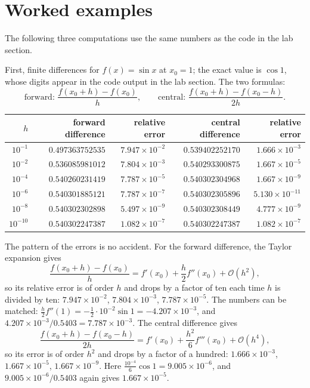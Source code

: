 \section{Worked examples}

The following three computations use the same numbers as the code in the lab section.

First, finite differences for $f(x)=\sin x$ at $x_{0}=1$; the exact value is $\cos 1$, whose
digits appear in the code output in the lab section. The two formulas:
\[
  \text{forward: }\frac{f(x_{0}+h)-f(x_{0})}{h},\qquad
  \text{central: }\frac{f(x_{0}+h)-f(x_{0}-h)}{2h}.
\]

\begin{center}
\begin{tabular}{rrrrr}
\hline
$h$ & forward difference & relative error & central difference & relative error\\
\hline
$10^{-1}$ & $0.497363752535$ & $7.947\times10^{-2}$ & $0.539402252170$ & $1.666\times10^{-3}$\\
$10^{-2}$ & $0.536085981012$ & $7.804\times10^{-3}$ & $0.540293300875$ & $1.667\times10^{-5}$\\
$10^{-4}$ & $0.540260231419$ & $7.787\times10^{-5}$ & $0.540302304968$ & $1.667\times10^{-9}$\\
$10^{-6}$ & $0.540301885121$ & $7.787\times10^{-7}$ & $0.540302305896$ & $5.130\times10^{-11}$\\
$10^{-8}$ & $0.540302302898$ & $5.497\times10^{-9}$ & $0.540302308449$ & $4.777\times10^{-9}$\\
$10^{-10}$ & $0.540302247387$ & $1.082\times10^{-7}$ & $0.540302247387$ & $1.082\times10^{-7}$\\
\hline
\end{tabular}
\end{center}

The pattern of the errors is no accident. For the forward difference, the Taylor expansion
gives
\[
  \frac{f(x_{0}+h)-f(x_{0})}{h}=f'(x_{0})+\frac{h}{2}f''(x_{0})+\mathcal{O}(h^{2}),
\]
so its relative error is of order $h$ and drops by a factor of ten each time $h$ is divided by
ten: $7.947\times10^{-2}$, $7.804\times10^{-3}$, $7.787\times10^{-5}$. The numbers can be
matched: $\frac{h}{2}f''(1)=-\frac{1}{2}\cdot10^{-2}\sin 1=-4.207\times10^{-3}$, and
$4.207\times10^{-3}/0.5403=7.787\times10^{-3}$. The central difference gives
\[
  \frac{f(x_{0}+h)-f(x_{0}-h)}{2h}=f'(x_{0})+\frac{h^{2}}{6}f'''(x_{0})+\mathcal{O}(h^{4}),
\]
so its error is of order $h^{2}$ and drops by a factor of a hundred: $1.666\times10^{-3}$,
$1.667\times10^{-5}$, $1.667\times10^{-9}$. Here $\frac{10^{-4}}{6}\cos 1
=9.005\times10^{-6}$, and $9.005\times10^{-6}/0.5403$ again gives $1.667\times10^{-5}$.

